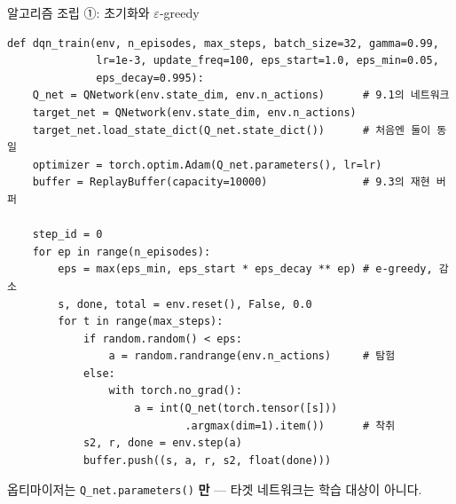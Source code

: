 \documentclass[aspectratio=169,11pt]{beamer}
\begin{document}

\begin{frame}[fragile]{알고리즘 조립 ①: 초기화와 $\varepsilon$-greedy}
\begin{lstlisting}
def dqn_train(env, n_episodes, max_steps, batch_size=32, gamma=0.99,
              lr=1e-3, update_freq=100, eps_start=1.0, eps_min=0.05,
              eps_decay=0.995):
    Q_net = QNetwork(env.state_dim, env.n_actions)      # 9.1의 네트워크
    target_net = QNetwork(env.state_dim, env.n_actions)
    target_net.load_state_dict(Q_net.state_dict())      # 처음엔 둘이 동일
    optimizer = torch.optim.Adam(Q_net.parameters(), lr=lr)
    buffer = ReplayBuffer(capacity=10000)               # 9.3의 재현 버퍼

    step_id = 0
    for ep in range(n_episodes):
        eps = max(eps_min, eps_start * eps_decay ** ep) # e-greedy, 감소
        s, done, total = env.reset(), False, 0.0
        for t in range(max_steps):
            if random.random() < eps:
                a = random.randrange(env.n_actions)     # 탐험
            else:
                with torch.no_grad():
                    a = int(Q_net(torch.tensor([s]))
                            .argmax(dim=1).item())      # 착취
            s2, r, done = env.step(a)
            buffer.push((s, a, r, s2, float(done)))
\end{lstlisting}
  {\footnotesize 옵티마이저는 \texttt{Q\_net.parameters()} \textbf{만} ---
  타겟 네트워크는 학습 대상이 아니다.}
\end{frame}
\end{document}
